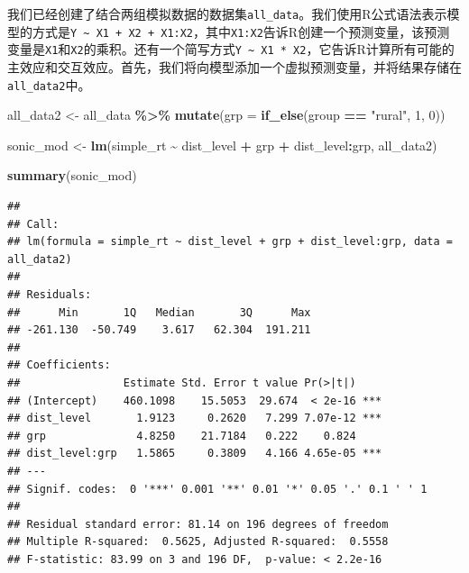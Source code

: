 \documentclass[
]{book}
\newenvironment{Shaded}{\begin{snugshade}}{\end{snugshade}}
\newcommand{\AttributeTok}[1]{\textcolor[rgb]{0.13,0.29,0.53}{#1}}
\newcommand{\DecValTok}[1]{\textcolor[rgb]{0.00,0.00,0.81}{#1}}
\newcommand{\FunctionTok}[1]{\textcolor[rgb]{0.13,0.29,0.53}{\textbf{#1}}}
\newcommand{\NormalTok}[1]{#1}
\newcommand{\OtherTok}[1]{\textcolor[rgb]{0.56,0.35,0.01}{#1}}
\newcommand{\SpecialCharTok}[1]{\textcolor[rgb]{0.81,0.36,0.00}{\textbf{#1}}}
\newcommand{\StringTok}[1]{\textcolor[rgb]{0.31,0.60,0.02}{#1}}
\begin{document}
我们已经创建了结合两组模拟数据的数据集\texttt{all\_data}。我们使用R公式语法表示模型的方式是\texttt{Y\ \textasciitilde{}\ X1\ +\ X2\ +\ X1:X2}，其中\texttt{X1:X2}告诉R创建一个预测变量，该预测变量是\texttt{X1}和\texttt{X2}的乘积。还有一个简写方式\texttt{Y\ \textasciitilde{}\ X1\ *\ X2}，它告诉R计算所有可能的主效应和交互效应。首先，我们将向模型添加一个虚拟预测变量，并将结果存储在\texttt{all\_data2}中。

\begin{Shaded}
\begin{Highlighting}[]
\NormalTok{all\_data2 }\OtherTok{\textless{}{-}}\NormalTok{ all\_data }\SpecialCharTok{\%\textgreater{}\%}
  \FunctionTok{mutate}\NormalTok{(}\AttributeTok{grp =} \FunctionTok{if\_else}\NormalTok{(group }\SpecialCharTok{==} \StringTok{"rural"}\NormalTok{, }\DecValTok{1}\NormalTok{, }\DecValTok{0}\NormalTok{))}
\end{Highlighting}
\end{Shaded}

\begin{Shaded}
\begin{Highlighting}[]
\NormalTok{sonic\_mod }\OtherTok{\textless{}{-}} \FunctionTok{lm}\NormalTok{(simple\_rt }\SpecialCharTok{\textasciitilde{}}\NormalTok{ dist\_level }\SpecialCharTok{+}\NormalTok{ grp }\SpecialCharTok{+}\NormalTok{ dist\_level}\SpecialCharTok{:}\NormalTok{grp,}
\NormalTok{                all\_data2)}

\FunctionTok{summary}\NormalTok{(sonic\_mod)}
\end{Highlighting}
\end{Shaded}

\begin{verbatim}
## 
## Call:
## lm(formula = simple_rt ~ dist_level + grp + dist_level:grp, data = all_data2)
## 
## Residuals:
##      Min       1Q   Median       3Q      Max 
## -261.130  -50.749    3.617   62.304  191.211 
## 
## Coefficients:
##                Estimate Std. Error t value Pr(>|t|)    
## (Intercept)    460.1098    15.5053  29.674  < 2e-16 ***
## dist_level       1.9123     0.2620   7.299 7.07e-12 ***
## grp              4.8250    21.7184   0.222    0.824    
## dist_level:grp   1.5865     0.3809   4.166 4.65e-05 ***
## ---
## Signif. codes:  0 '***' 0.001 '**' 0.01 '*' 0.05 '.' 0.1 ' ' 1
## 
## Residual standard error: 81.14 on 196 degrees of freedom
## Multiple R-squared:  0.5625, Adjusted R-squared:  0.5558 
## F-statistic: 83.99 on 3 and 196 DF,  p-value: < 2.2e-16
\end{verbatim}
\end{document}
